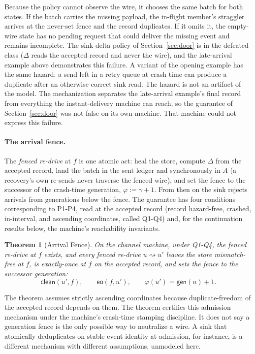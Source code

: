 \documentclass[sigplan,10pt]{acmart}
\theoremstyle{plain}
\newtheorem{theorem}{Theorem}
\theoremstyle{definition}
\newcommand{\gen}{\mathsf{gen}}            %
\newcommand{\eo}{\mathsf{eo}}              %
\newcommand{\clean}{\mathsf{clean}}        %
\newcommand{\sdelta}{\Delta}               %
\begin{document}
Because the policy cannot observe the wire, it chooses the same
batch for both states. If the
batch carries the missing payload, the in-flight member's straggler
arrives at the never-set fence and the record duplicates. If it omits
it, the empty-wire state has no pending request that could deliver the
missing event and remains incomplete. The
sink-delta policy of Section~\ref{sec:door} is in the defeated
class ($\sdelta$ reads the accepted record and never the wire), and
the late-arrival example above demonstrates this failure. A variant of the
opening example has the same hazard: a send left in a retry queue at
crash time can produce a duplicate after an otherwise correct sink
read. The hazard is not an artifact of the model.
The mechanization separates the late-arrival example's final record from
everything the instant-delivery machine can reach, so the guarantee of
Section~\ref{sec:door} was not false on its own machine. That machine
could not express this failure.

\paragraph{The arrival fence.}
The \emph{fenced re-drive} at $f$ is one atomic act: heal the store,
compute $\sdelta$ from the accepted record, land the batch in the sent
ledger and synchronously in $A$ (a recovery's own re-sends never
traverse the fenced wire), and set the fence to the successor of the
crash-time generation, $\varphi := \gamma + 1$. From then on the sink
rejects arrivals from generations below the fence. The guarantee has four
conditions corresponding to
P1-P4, read at the accepted record (record
hazard-free, crashed, in-interval, and ascending coordinates, called
Q1-Q4) and, for the continuation results below, the machine's
reachability invariants.

\begin{theorem}[Arrival Fence]\label{thm:fence}
On the channel machine, under Q1-Q4, the fenced re-drive at $f$
exists, and every fenced re-drive $u \rightsquigarrow u'$ leaves the
store mismatch-free at $f$, is exactly-once at $f$ on the accepted
record, and sets the fence to the successor generation:
\[
  \clean(u',f), \qquad \eo(f,u'), \qquad
  \varphi(u') = \gen(u) + 1.
\]
\end{theorem}

The theorem assumes strictly ascending coordinates because
duplicate-freedom of the accepted record depends on them. The theorem
certifies this admission mechanism under the machine's crash-time
stamping discipline. It does
not say a generation fence is the only possible way to neutralize a
wire. A sink that atomically deduplicates on stable event identity at
admission, for instance, is a different mechanism with different
assumptions, unmodeled here.
\end{document}
